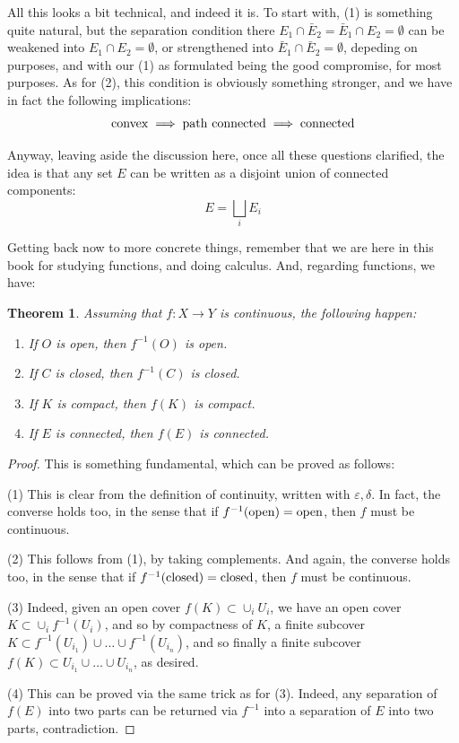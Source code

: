 \documentclass[12pt]{amsbook}
\newtheorem{theorem}{Theorem}[chapter]
\begin{document}
All this looks a bit technical, and indeed it is. To start with, (1) is something quite natural, but the separation condition there $E_1\cap\bar{E}_2=\bar{E}_1\cap E_2=\emptyset$ can be weakened into $E_1\cap E_2=\emptyset$, or strengthened into $\bar{E}_1\cap\bar{E}_2=\emptyset$, depeding on purposes, and with our (1) as formulated being the good compromise, for most purposes. As for (2), this condition is obviously something stronger, and we have in fact the following implications:
$${\rm convex}\implies{\rm path\ connected}\implies {\rm connected}$$

Anyway, leaving aside the discussion here, once all these questions clarified, the idea is that any set $E$ can be written as a disjoint union of connected components:
$$E=\bigsqcup_i E_i$$

Getting back now to more concrete things, remember that we are here in this book for studying functions, and doing calculus. And, regarding functions, we have:


\begin{theorem}
Assuming that $f:X\to Y$ is continuous, the following happen:
\begin{enumerate}
\item If $O$ is open, then $f^{-1}(O)$ is open. 

\item If $C$ is closed, then $f^{-1}(C)$ is closed. 

\item If $K$ is compact, then $f(K)$ is compact. 

\item If $E$ is connected, then $f(E)$ is connected. 
\end{enumerate}
\end{theorem}

\begin{proof}
This is something fundamental, which can be proved as follows:

\medskip

(1) This is clear from the definition of continuity, written with $\varepsilon,\delta$. In fact, the converse holds too, in the sense that if $f^{-1}({\rm open})={\rm open}$, then $f$ must be continuous.

\medskip

(2) This follows from (1), by taking complements. And again, the converse holds too, in the sense that if $f^{-1}({\rm closed})={\rm closed}$, then $f$ must be continuous.

\medskip

(3) Indeed, given an open cover $f(K)\subset\cup_iU_i$, we have an open cover $K\subset\cup_if^{-1}(U_i)$, and so by compactness of $K$, a finite subcover $K\subset f^{-1}(U_{i_1})\cup\ldots\cup f^{-1}(U_{i_n})$, and so finally a finite subcover $f(K)\subset U_{i_1}\cup\ldots\cup U_{i_n}$, as desired.

\medskip

(4) This can be proved via the same trick as for (3). Indeed, any separation of $f(E)$ into two parts can be returned via $f^{-1}$ into a separation of $E$ into two parts, contradiction.
\end{proof}
\end{document}
